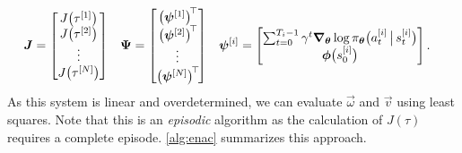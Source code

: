 			\begin{align}
				\bm{J}          & = \begin{bmatrix} J\bigl( \tau^{[1]} \bigr) \\ J\bigl( \tau^{[2]} \bigr) \\ \vdots \\ J\bigl( \tau^{[N]} \bigr) \end{bmatrix}                                                                                               &
				\bm{\Psi}       & = \begin{bmatrix} \bigl(\bm{\psi}^{[1]}\bigr)^{\!\top\!} \\ \bigl(\bm{\psi}^{[2]}\bigr)^{\!\top\!} \\ \vdots \\ \bigl(\bm{\psi}^{[N]}\bigr)^{\!\top\!} \end{bmatrix}                                                  &
				\bm{\psi}^{[i]} & = \begin{bmatrix} \sum_{t = 0}^{T_i - 1} \gamma^t \grad_{\bm{\theta}} \log \pi_{\bm{\theta}}\bigl( a_t^{[i]} \,\big\vert\, s_t^{[i]} \bigr) \\ \bm{\phi}\bigl(s_0^{[i]}\bigr) \end{bmatrix}.
			\end{align}
			As this system is linear and overdetermined, we can evaluate \(\vec{\omega}\) and \(\vec{v}\) using least squares. Note that this is an \emph{episodic} algorithm as the calculation of \(J(\tau)\) requires a complete episode. \autoref{alg:enac} summarizes this approach.

